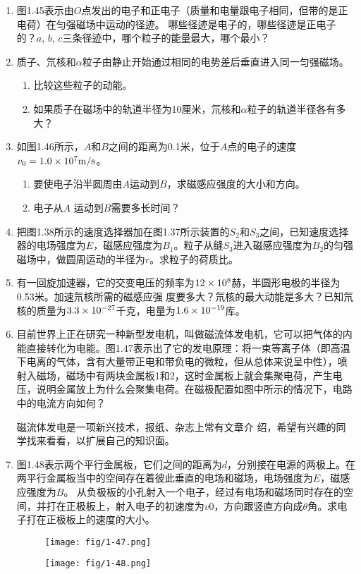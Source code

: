 \begin{enumerate}
\item 图1.45表示由$O$点发出的电子和正电子（质量和电量跟电子相同，但带的是正电荷）在匀强磁场中运动的径迹。
哪些径迹是电子的，哪些径迹是正电子的？$a$, $b$, $c$三条径迹中，哪个粒子的能量最大，哪个最小？
\item 质子、氘核和$\alpha$粒子由静止开始通过相同的电势差后垂直进入同一匀强磁场。
\begin{enumerate}
    \item 比较这些粒子的动能。
    \item 如果质子在磁场中的轨道半径为10厘米，氘核和$\alpha$粒子的轨道半径各有多大？
\end{enumerate}
\item 如图1.46所示，$A$和$B$之间的距离为0.1米，位于$A$点的电子的速度$v_0=1.0\times10^7\text{m}/\text{s}$。
\begin{enumerate}
    \item 要使电子沿半圆周由$A$运动到$B$，求磁感应强度的大小和方向。
    \item 电子从$A$
运动到$B$需要多长时间？
\end{enumerate}
\item 把图1.38所示的速度选择器加在图1.37所示装置的$S_2$和$S_3$之间，已知速度选择器的电场强度为$E$，磁感应强度为$B_1$。粒子从缝$S_3$进入磁感应强度为$B_2$的匀强磁场中，做圆周运动的半径为$r$。求粒子的荷质比。
\item  有一回旋加速器，它的交变电压的频率为$12\times10^8$赫，半圆形电极的半径为0.53米。加速氘核所需的磁感应强
度要多大？氘核的最大动能是多大？已知氘核的质量为$3.3\times10^{-27}$千克，电量为$1.6\times10^{-19}$库。
\item 目前世界上正在研究一种新型发电机，叫做磁流体发电机，它可以把气体的内能直接转化为电能。图1.47表示出了它的发电原理：将一束等离子体（即高温下电离的气体，含有大量带正电和带负电的微粒，但从总体来说呈中性），喷射入磁场，磁场中有两块金属板1和2，这时金属板上就会集聚电荷，产生电压，说明金属放上为什么会聚集电荷。在磁极配置如图中所示的情况下，电路中的电流方向如何？

磁流体发电是一项新兴技术，报纸、杂志上常有文章介
绍，希望有兴趣的同学找来看看，以扩展自己的知识面。
\item  图1.48表示两个平行金属板，它们之间的距离为$d$，分别接在电源的两极上。在两平行金属板当中的空间存在着彼此垂直的电场和磁场，电场强度为$E$，磁感应强度为$B$。 从负极板的小孔射入一个电子，经过有电场和磁场同时存在的空间，并打在正极板上，射入电子的初速度为$v0$，方向跟竖直方向成$\theta$角。求电子打在正极板上的速度的大小。

\begin{figure}[htp]\centering
	\texttt{[image: fig/1-47.png]}
	\caption{ }
\end{figure}\begin{figure}[htp]\centering
\texttt{[image: fig/1-48.png]}
\caption{ }
\end{figure}
\end{enumerate}